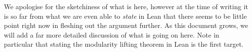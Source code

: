 We apologise for the sketchiness of what is here, however at the time of writing it is so far from what we are even able to \emph{state} in Lean that there seems to be little point right now in fleshing out the argument further. As this document grows, we will add a far more detailed discussion of what is going on here. Note in particular that stating the modularity lifting theorem in Lean is the first target.
